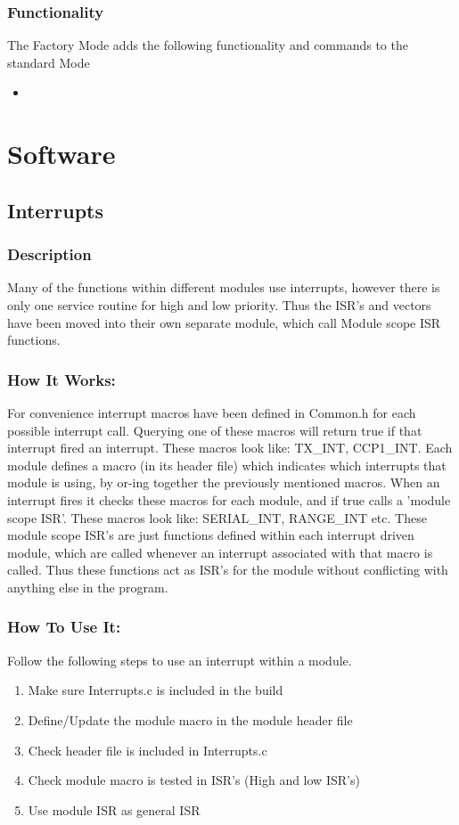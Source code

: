 \documentclass[]{report}
\begin{document}
\section{Functionality}
The Factory Mode adds the following functionality and commands to the standard Mode
\begin{itemize}
	\item
\end{itemize}


\part{Software}

\chapter{Interrupts}
\section{Description}
Many of the functions within different modules use interrupts, however there is only one service routine for high and low priority. Thus the ISR's and vectors have been moved into their own separate module, which call Module scope ISR functions.

\section{How It Works:}
For convenience interrupt macros have been defined in Common.h for each possible interrupt call. Querying one of these macros will return true if that interrupt fired an interrupt. These macros look like: TX\_INT, CCP1\_INT.\newline
Each module defines a macro (in its header file) which indicates which interrupts that module is using, by or-ing together the previously mentioned macros. When an interrupt fires it checks these macros for each module, and if true calls a 'module scope ISR'. These macros look like: SERIAL\_INT, RANGE\_INT etc. \newline
These module scope ISR's are just functions defined within each interrupt driven module, which are called whenever an interrupt associated with that macro is called. Thus these functions act as ISR's for the module without conflicting with anything else in the program.

\section{How To Use It:}
Follow the following steps to use an interrupt within a module.
\begin{enumerate}
	\item Make sure Interrupts.c is included in the build
	\item Define/Update the module macro in the module header file
	\item Check header file is included in Interrupts.c
	\item Check module macro is tested in ISR's (High and low ISR's)
	\item Use module ISR as general ISR
\end{enumerate}
\end{document}
